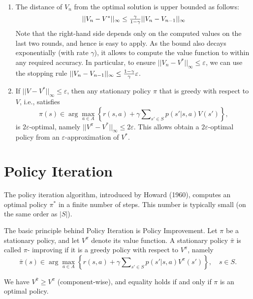 \begin{enumerate}
  \item The distance of ${V_n}$ from the optimal solution is upper bounded as follows:
                                           \[||{V_n} - V_{}^*|{|_\infty } \le {\textstyle{\gamma  \over {1 - \gamma }}}||{V_n} - {V_{n - 1}}|{|_\infty }\]
Note that the right-hand side depends only on the computed values on the last two rounds, and hence is easy to apply. As the bound also decays exponentially (with rate $\gamma $), it allows to compute the value function to within any required accuracy. In particular, to ensure $||{V_n} - V_{}^*|{|_\infty } \le \varepsilon $, we can use the stopping rule  $||{V_n} - {V_{n - 1}}|{|_\infty } \le {\textstyle{{1 - \gamma } \over \gamma }}\varepsilon $.

\item If $||V - V_{}^*|{|_\infty } \le \varepsilon $, then any stationary policy $\pi $ that is greedy with respect to $V$, i.e., satisfies
\[\pi (s) \in \arg {\max _{a \in A}}\left\{ {r(s,a) + \gamma \sum\nolimits_{s' \in S} {p(s'|s,a){V}(s')} } \right\},\]
is $2\varepsilon $-optimal, namely $||V_{}^\pi  - V_{}^*|{|_\infty } \le 2\varepsilon $.
This allows obtain a $2\varepsilon $-optimal policy from an $\varepsilon $-approximation of  $V_{}^*$.
\end{enumerate}

\section{Policy Iteration}

The policy iteration algorithm, introduced by Howard (1960), computes an optimal policy ${\pi ^*}$ in a finite number of steps. This number is typically small (on the same order as $|S|$).

The basic principle behind Policy Iteration is Policy Improvement. Let $\pi$ be a stationary policy, and let $V_{}^\pi $ denote  its value function. A stationary policy $\bar \pi $ is called $\pi$- improving if it is a greedy policy with respect to ${V^\pi }$, namely
\[\bar \pi (s) \in \arg {\max _{a \in A}}\left\{ {r(s,a) + \gamma \sum\nolimits_{s' \in S} {p(s'|s,a){V^\pi }(s')} } \right\}, \quad s \in S.\]

\begin{lemma} We have
${V^{\bar \pi }} \ge {V^\pi }$ (component-wise), and equality holds if and only if  $\pi $ is an optimal policy.
\end{lemma}

